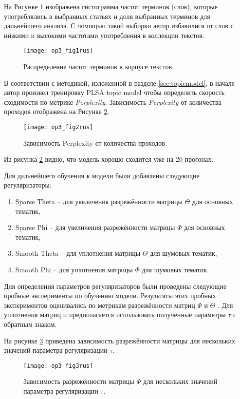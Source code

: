 На Рисунке \ref{fig:op3_1} изображена гистограмма частот терминов (слов), которые употреблялись в выбранных статьях и доля выбранных терминов для дальнейшего анализа. С помощью такой выборки автор избавилися от слов с низкими и высокими частотами употребления в коллекции текстов.

\begin{figure}[H]
  \caption{Распределение частот терминов в корпусе текстов.}
  \centering
    \texttt{[image: op3\_fig1rus]}
  \label{fig:op3_1}
\end{figure}  

В соответствии с методикой, изложенной в разделе \ref{sec:topicmodel}, в начале автор произвел тренировку PLSA topic model чтобы определить
скорость сходимости по метрике \emph{Perplexity}. Зависимость \emph{Perplexity} от количества проходов отображена на Рисунке \ref{fig:op3_2}.

\begin{figure}[H]
  \caption{Зависимость Perplexity от количества проходов.}
  \centering
    \texttt{[image: op3\_fig2rus]}
  \label{fig:op3_2}
\end{figure}  

Из рисунка \ref{fig:op3_2} видно, что модель хорошо сходится уже на 20 прогонах.

Для дальнейшего обучения к модели были добавлены следующие регуляризаторы:

\begin{enumerate}
\def\labelenumi{\arabic{enumi}.}
\tightlist
\item Sparse Theta -- для увеличения разрежённости матрицы $\Theta$ для основных тематик,
\item Sparse Phi -- для увеличения разрежённости матрицы $\Phi$ для основных тематик,
\item Smooth Theta -- для уплотнения матрицы $\Theta$ для шумовых тематик,
\item Smooth Phi -- для уплотнения матрицы $\Phi$ для шумовых тематик.
\end{enumerate}

Для определения параметров регуляризаторов были проведены следующие пробные эксперименты по обучению модели. 
Результаты этих пробных экспериментов оценивались по метрикам разрежённости матриц $\Phi$ и $\Theta$ . 
Для уплотнения матриц и предполагается использовать полученные параметры $\tau$ с  обратным знаком.

На рисунке \ref{fig:op3_3} приведена зависимость разрежённости матрицы для нескольких значений параметра регуляризации $ \tau $.
\begin{figure}[H]
  \caption{Зависимость разрежённости матрицы $ \Phi $ для нескольких значений параметра регуляризации $ \tau $.}
  \centering
    \texttt{[image: op3\_fig3rus]}
  \label{fig:op3_3}
\end{figure}  

